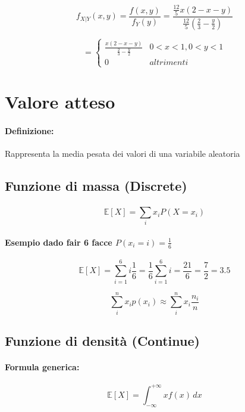 \documentclass[]{article}
\newcommand{\ev}{\mathbb{E}[X]}
\renewcommand{\ev}[1]{\mathbb{E}[#1]}
\newcommand{\definizione}{\paragraph{Definizione:}}
\newcommand{\formula}{\paragraph{Formula generica:}}
\begin{document}
    \begin{equation*}
        f_{X|Y}(x,y) = \frac{f(x,y)}{f_Y(y)} = \frac{\frac{12}{5} x(2-x-y)}{\frac{12}{5}(\frac{2}{3} - \frac{y}{2})}
    \end{equation*}
    
    \begin{equation*}
    =
    \begin{cases}
        \frac{x(2-x-y)}{\frac{2}{3} - \frac{y}{2}} & 0 < x < 1, 0 < y < 1 \\
        0 & altrimenti
    \end{cases}
    \end{equation*}

    \section{Valore atteso}
    \definizione Rappresenta la media pesata dei valori di una variabile aleatoria

    \subsection{Funzione di massa (Discrete)}
    \[ \ev{X} = \sum_{i}^{} x_i P(X = x_i) \]

    \paragraph{Esempio dado fair 6 facce $P(x_i = i) = \frac{1}{6}$}
    \[ \ev{X} = \sum_{i=1}^{6} i \frac{1}{6} = \frac{1}{6} \sum_{i=1}^{6} i = \frac{21}{6} = \frac{7}{2} = 3.5 \]

    \begin{center}
        \[ \sum_{i}^{n} x_i p(x_i) \approx \sum_{i}^{n} x_i \frac{n_i}{n}\]
    \end{center}
    
    
    \subsection{Funzione di densità (Continue)}
    \formula \[ \ev{X} = \int_{-\infty}^{+\infty} x f(x) \, dx \]
\end{document}
